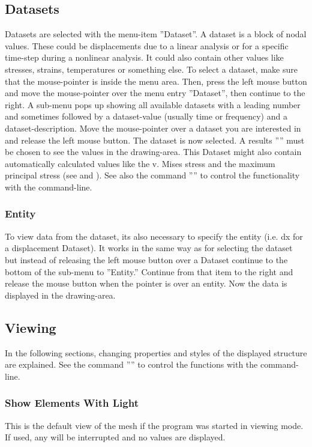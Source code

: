 \documentclass{article}
\begin{document}
\subsection{\label{Datasets}Datasets}
Datasets are selected with the menu-item ''Dataset''. A dataset is a block of nodal values. These could be displacements due to a linear analysis or for a specific time-step during a nonlinear analysis. It could also contain other values like stresses, strains, temperatures or something else. To select a dataset, make sure that the mouse-pointer is inside the menu area. Then, press the left mouse button and move the mouse-pointer over the menu entry ''Dataset'', then continue to the right. A sub-menu pops up showing all available datasets with a leading number and sometimes followed by a dataset-value (usually time or frequency) and a dataset-description. Move the mouse-pointer over a dataset you are interested in and release the left mouse button. The dataset is now selected. A results '''' must be chosen to see the values in the drawing-area. This Dataset might also contain automatically calculated values like the v. Mises stress and the maximum principal stress (see  and ). See also the command '''' to control the functionality with the command-line.

\subsubsection{\label{Entity}Entity}
To view data from the dataset, its also necessary to specify the entity (i.e. dx for a displacement Dataset). It works in the same way as for selecting the dataset but instead of releasing the left mouse button over a Dataset continue to the bottom of the sub-menu to ''Entity.''  Continue from that item to the right and release the mouse button when the pointer is over an entity.  Now the data is displayed in the drawing-area.

\subsection{\label{Viewing}Viewing}
In the following sections, changing properties and styles of the displayed structure are explained. See the command '''' to control the functions with the command-line.

\subsubsection{\label{Show Elements With Light}Show Elements With Light}
This is the default view of the mesh if the program was started in viewing mode. If used, any  will be interrupted and no values are displayed.  
\end{document}
